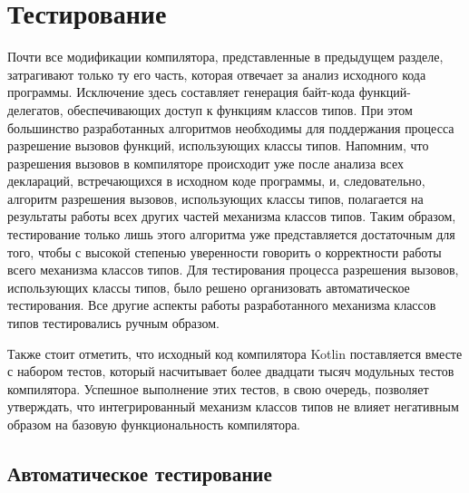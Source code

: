 \section{Тестирование}

Почти все модификации компилятора, представленные в предыдущем разделе, затрагивают только ту его часть, которая отвечает за анализ исходного кода программы. Исключение здесь составляет генерация байт-кода функций-делегатов, обеспечивающих доступ к функциям классов типов. При этом большинство разработанных алгоритмов необходимы для поддержания процесса разрешение вызовов функций, использующих классы типов. Напомним, что разрешения вызовов в компиляторе происходит уже после анализа всех деклараций, встречающихся в исходном коде программы, и, следовательно, алгоритм разрешения вызовов, использующих классы типов, полагается на результаты работы всех других частей механизма классов типов. Таким образом, тестирование только лишь этого алгоритма уже представляется достаточным для того, чтобы с высокой степенью уверенности говорить о корректности работы всего механизма классов типов. Для тестирования процесса разрешения вызовов, использующих классы типов, было решено организовать автоматическое тестирования. Все другие аспекты работы разработанного механизма классов типов тестировались ручным образом. 

Также стоит отметить, что исходный код компилятора Kotlin поставляется вместе с набором тестов, который насчитывает более двадцати тысяч модульных тестов компилятора. Успешное выполнение этих тестов, в свою очередь, позволяет утверждать, что интегрированный механизм классов типов не влияет негативным образом на базовую функциональность компилятора. 

\subsection{Автоматическое тестирование}


